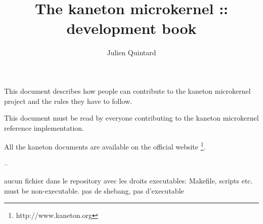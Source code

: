 %
%
%
%
%
%

%
%

\def\path{../..}

%
%



%
%

\rhead{}

%
%

\title{The kaneton microkernel :: development book
       \logos}

%
%

\author{\small{Julien Quintard}}

%
%



%
%

\maketitle

%
%

This document describes how people can contribute to the kaneton microkernel
project and the rules they have to follow.

This document must be read by everyone contributing to the kaneton microkernel
reference implementation.

All the kaneton documents are available on
the official website
  \footnote{http://www.kaneton.org}.

%
%

\tableofcontents

%
%












%
%

--

aucun fichier dans le repository avec les droits executables: Makefile,
scripts etc. must be non-executable.
pas de shebang, pas d'executable

